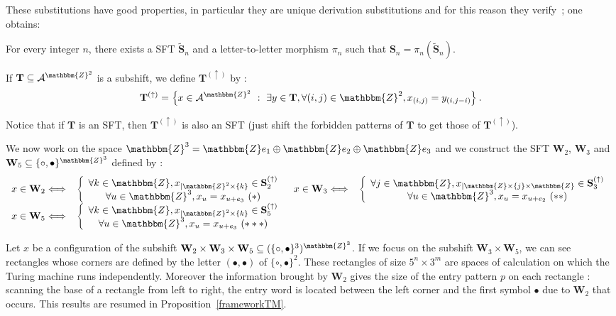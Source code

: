 \documentclass[proceedings]{stacs}
\theoremstyle{plain}\newtheorem{satz}[thm]{Satz}
\theoremstyle{definition}\newtheorem{crucial}[thm]{Crucial Definition}
\newcommand{\Z}{\mathbbm{Z}}
\newcommand{\A}{\mathcal{A}}
\newcommand{\T}{\mathbf{T}}
\newcommand{\Sub}{\mathbf{S}}
\newcommand{\W}{\mathbf{W}}
\begin{document}
These substitutions have good properties, in particular they are unique derivation substitutions and for this reason they verify~\cite{mozes1989tss}; one obtains:
\begin{proposition}
For every integer $n$, there exists a SFT  $\tilde{\Sub}_n$ and a letter-to-letter morphism $\pi_n$ such that $\Sub_n=\pi_n(\tilde{\Sub}_n).$
\end{proposition}

\begin{definition}
If $\T\subseteq  \A^{\Z^2}$ is a subshift, we define $\T^{(\uparrow)}$ by :
$$\T^{(\uparrow)}=\left\{x\in\A^{\Z^2} \ : \ \exists  y\in\T,\forall(i,j)\in\Z^2, x_{(i,j)}=y_{(i,j-i)} \right\}.$$

Notice that if $\T$ is an SFT, then $\T^{(\uparrow)}$ is also an SFT (just shift the forbidden patterns of $\T$ to get those of $\T^{(\uparrow)}$).
\end{definition}

We now work on the space $\mathbbm{Z}^3=\mathbbm{Z}e_1\oplus\mathbbm{Z}e_2\oplus\mathbbm{Z}e_3$ and we construct the SFT $\W_2$, $\W_3$ and $\W_5\subseteq \{ \circ,\bullet\}^{\mathbbm{Z}^3}$ defined by :
$$
\begin{array}{clcl}
x\in \W_2 \Longleftrightarrow
&
\left\{
\begin{array}{c}
\forall k\in\mathbbm{Z}, x_{|\mathbbm{Z}^2\times\{ k\}} \in \Sub_2^{(\uparrow)}\\
\forall u\in\mathbbm{Z}^3, x_u=x_{u+e_3} ~(*)
\end{array}
\right.
&
x\in \W_3 \Longleftrightarrow
&
\left\{
\begin{array}{c}
\forall j\in\mathbbm{Z}, x_{|\mathbbm{Z}\times\{ j\}\times\mathbbm{Z}} \in \Sub_3^{(\uparrow)}\\
\forall u\in\mathbbm{Z}^3, x_u=x_{u+e_2} ~(**)
\end{array}
\right.\\

x\in \W_5 \Longleftrightarrow
&
\left\{
\begin{array}{c}
\forall k\in\mathbbm{Z}, x_{|\Z^2\times\{ k\}} \in \Sub_5^{(\uparrow)}\\
\forall u\in\mathbbm{Z}^3, x_u=x_{u+e_3} ~(***)
\end{array}
\right.
&
&

\end{array}
$$


Let $x$ be a configuration of the subshift $\W_2\times \W_3\times \W_5 \subseteq (\{ \circ,\bullet \}^3)^{\Z^3}$. If we focus on the subshift $\W_3\times \W_5$, we can see rectangles whose corners are defined by the letter $(\bullet,\bullet)$ of $\{ \circ,\bullet \}^2$. These rectangles of size $5^n\times 3^m$ are spaces of calculation on which the Turing machine runs independently. Moreover the information brought by $\W_2$ gives the size of the entry pattern $p$ on each rectangle : scanning the base of a rectangle from left to right, the entry word is located between the left corner and the first symbol $\bullet$ due to $\W_2$ that occurs. This results are resumed in Proposition~\ref{frameworkTM}.
\end{document}
